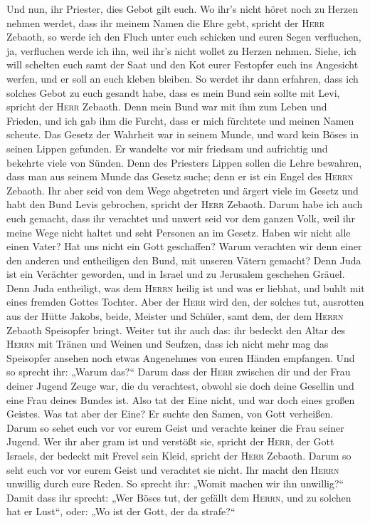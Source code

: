  Und nun, ihr Priester, dies Gebot gilt euch.
 Wo ihr's nicht höret noch zu Herzen nehmen werdet, dass
ihr meinem Namen die Ehre gebt, spricht der \textsc{Herr} Zebaoth, so
werde ich den Fluch unter euch schicken und euren Segen verfluchen, ja,
verfluchen werde ich ihn, weil ihr's nicht wollet zu Herzen nehmen.
 Siehe, ich will schelten euch samt der Saat und den Kot
eurer Festopfer euch ins Angesicht werfen, und er soll an euch kleben
bleiben.  So werdet ihr dann erfahren, dass ich solches
Gebot zu euch gesandt habe, dass es mein Bund sein sollte mit Levi,
spricht der \textsc{Herr} Zebaoth.  Denn mein Bund war mit
ihm zum Leben und Frieden, und ich gab ihm die Furcht, dass er mich
fürchtete und meinen Namen scheute.  Das Gesetz der
Wahrheit war in seinem Munde, und ward kein Böses in seinen Lippen
gefunden. Er wandelte vor mir friedsam und aufrichtig und bekehrte viele
von Sünden.  Denn des Priesters Lippen sollen die Lehre
bewahren, dass man aus seinem Munde das Gesetz suche; denn er ist ein
Engel des \textsc{Herrn} Zebaoth.  Ihr aber seid von dem
Wege abgetreten und ärgert viele im Gesetz und habt den Bund Levis
gebrochen, spricht der \textsc{Herr} Zebaoth.  Darum habe
ich auch euch gemacht, dass ihr verachtet und unwert seid vor dem ganzen
Volk, weil ihr meine Wege nicht haltet und seht Personen an im Gesetz.
 Haben wir nicht alle einen Vater? Hat uns nicht ein Gott
geschaffen? Warum verachten wir denn einer den anderen und entheiligen
den Bund, mit unseren Vätern gemacht?  Denn Juda ist ein
Verächter geworden, und in Israel und zu Jerusalem geschehen Gräuel.
Denn Juda entheiligt, was dem \textsc{Herrn} heilig ist und was er
liebhat, und buhlt mit eines fremden Gottes Tochter. 
Aber der \textsc{Herr} wird den, der solches tut, ausrotten aus der
Hütte Jakobs, beide, Meister und Schüler, samt dem, der dem
\textsc{Herrn} Zebaoth Speisopfer bringt.  Weiter tut ihr
auch das: ihr bedeckt den Altar des \textsc{Herrn} mit Tränen und Weinen
und Seufzen, dass ich nicht mehr mag das Speisopfer ansehen noch etwas
Angenehmes von euren Händen empfangen.  Und so sprecht
ihr: „Warum das?{}`` Darum dass der \textsc{Herr} zwischen dir und der
Frau deiner Jugend Zeuge war, die du verachtest, obwohl sie doch deine
Gesellin und eine Frau deines Bundes ist.  Also tat der
Eine nicht, und war doch eines großen Geistes. Was tat aber der Eine? Er
suchte den Samen, von Gott verheißen. Darum so sehet euch vor vor eurem
Geist und verachte keiner die Frau seiner Jugend.  Wer
ihr aber gram ist und verstößt sie, spricht der \textsc{Herr}, der Gott
Israels, der bedeckt mit Frevel sein Kleid, spricht der \textsc{Herr}
Zebaoth. Darum so seht euch vor vor eurem Geist und verachtet sie nicht.
 Ihr macht den \textsc{Herrn} unwillig durch eure Reden.
So sprecht ihr: „Womit machen wir ihn unwillig?{}`` Damit dass ihr
sprecht: „Wer Böses tut, der gefällt dem \textsc{Herrn}, und zu solchen
hat er Lust``, oder: „Wo ist der Gott, der da strafe?{}``


